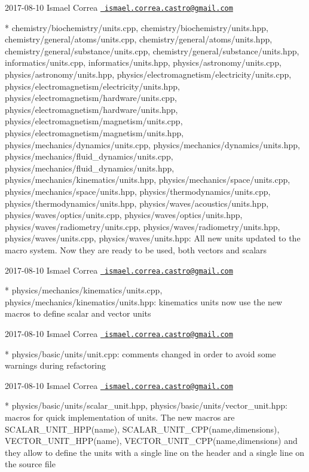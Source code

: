  2017-\/08-\/10 Ismael Correa \href{mailto:ismael.correa.castro@gmail.com}{\texttt{ ismael.\+correa.\+castro@gmail.\+com}} \begin{DoxyVerb}* chemistry/biochemistry/units.cpp,
chemistry/biochemistry/units.hpp,
chemistry/general/atoms/units.cpp,
chemistry/general/atoms/units.hpp,
chemistry/general/substance/units.cpp,
chemistry/general/substance/units.hpp, informatics/units.cpp,
informatics/units.hpp, physics/astronomy/units.cpp,
physics/astronomy/units.hpp,
physics/electromagnetism/electricity/units.cpp,
physics/electromagnetism/electricity/units.hpp,
physics/electromagnetism/hardware/units.cpp,
physics/electromagnetism/hardware/units.hpp,
physics/electromagnetism/magnetism/units.cpp,
physics/electromagnetism/magnetism/units.hpp,
physics/mechanics/dynamics/units.cpp,
physics/mechanics/dynamics/units.hpp,
physics/mechanics/fluid_dynamics/units.cpp,
physics/mechanics/fluid_dynamics/units.hpp,
physics/mechanics/kinematics/units.hpp,
physics/mechanics/space/units.cpp,
physics/mechanics/space/units.hpp,
physics/thermodynamics/units.cpp, physics/thermodynamics/units.hpp,
physics/waves/acoustics/units.hpp, physics/waves/optics/units.cpp,
physics/waves/optics/units.hpp, physics/waves/radiometry/units.cpp,
physics/waves/radiometry/units.hpp, physics/waves/units.cpp,
physics/waves/units.hpp: All new units updated to the macro system.
Now they are ready to be used, both vectors and scalars
\end{DoxyVerb}
 2017-\/08-\/10 Ismael Correa \href{mailto:ismael.correa.castro@gmail.com}{\texttt{ ismael.\+correa.\+castro@gmail.\+com}} \begin{DoxyVerb}* physics/mechanics/kinematics/units.cpp,
physics/mechanics/kinematics/units.hpp: kinematics units now use the
new macros to define scalar and vector units
\end{DoxyVerb}
 2017-\/08-\/10 Ismael Correa \href{mailto:ismael.correa.castro@gmail.com}{\texttt{ ismael.\+correa.\+castro@gmail.\+com}} \begin{DoxyVerb}* physics/basic/units/unit.cpp: comments changed in order to avoid
some warnings during refactoring
\end{DoxyVerb}
 2017-\/08-\/10 Ismael Correa \href{mailto:ismael.correa.castro@gmail.com}{\texttt{ ismael.\+correa.\+castro@gmail.\+com}} \begin{DoxyVerb}* physics/basic/units/scalar_unit.hpp,
physics/basic/units/vector_unit.hpp: macros for quick implementation
of units. The new macros are SCALAR_UNIT_HPP(name),
SCALAR_UNIT_CPP(name,dimensions), VECTOR_UNIT_HPP(name),
VECTOR_UNIT_CPP(name,dimensions) and they allow to define the units
with a single line on the header and a single line on the source
file
\end{DoxyVerb}
